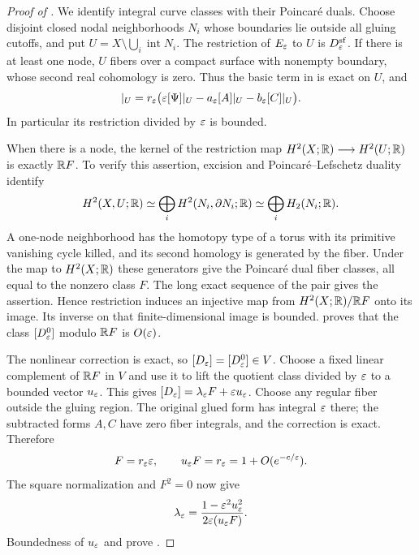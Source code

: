 \begin{proof}[Proof of ]
We identify integral curve classes with their Poincar\'e duals.
Choose disjoint closed nodal neighborhoods $N_i$ whose boundaries
lie outside all gluing cutoffs, and put
$U=X\setminus\bigcup_i\operatorname{int}N_i$.  The restriction of
$E_\varepsilon$ to $U$ is $D^{\mathrm{sf}}_\varepsilon$.  If there is at least
one node, $U$ fibers over a compact surface with nonempty boundary,
whose second real cohomology is zero.  Thus the basic term in
 is exact on $U$, and
\begin{equation}
  [D^0_\eps]|_U
  =r_\eps\bigl(\eps[\Psi]|_U
         -a_\eps[A]|_U-b_\eps[C]|_U\bigr).
  \label{eq:auxiliary-restriction-class}
\end{equation}
In particular its restriction divided by $\varepsilon$ is bounded.

When there is a node, the kernel of the restriction map
$H^2(X;\mathbb R)\longrightarrow H^2(U;\mathbb R)$ is exactly $\mathbb R F$.
To verify this assertion, excision and
Poincar\'e--Lefschetz duality identify
\[
  H^2(X,U;\mathbb R)
    \simeq\bigoplus_i H^2(N_i,\partial N_i;\mathbb R)
    \simeq\bigoplus_i H_2(N_i;\mathbb R).
\]
A one-node neighborhood has the homotopy type of a torus with its
primitive vanishing cycle killed, and its second homology is generated
by the fiber.  Under the map to $H^2(X;\mathbb R)$ these generators give
the Poincar\'e dual fiber classes, all equal to the nonzero class $F$.
The long exact sequence of the pair gives the assertion.
Hence restriction induces an injective map from
$H^2(X;\mathbb R)/\mathbb R F$ onto its image.  Its inverse on that
finite-dimensional image is bounded.   proves that the class
$[D^0_\varepsilon]$ modulo $\mathbb R F$ is $O(\varepsilon)$.

The nonlinear correction is exact, so
$[D_\varepsilon]=[D^0_\varepsilon]\in V$.  Choose a fixed linear complement of
$\mathbb R F$ in $V$ and use it to lift the quotient class divided by
$\varepsilon$ to a bounded vector $u_\varepsilon$.  This gives
$[D_\varepsilon]=\lambda_\varepsilon F+\varepsilon u_\varepsilon$.
Choose any regular fiber outside the gluing region.  The original
glued form has integral $\varepsilon$ there; the subtracted forms $A,C$
have zero fiber integrals, and the correction is exact.  Therefore
\begin{equation}
  [D_\eps]F=r_\eps\eps,\qquad u_\eps F=r_\eps=1+O(e^{-c/\eps}).
  \label{eq:auxiliary-fiber-area}
\end{equation}
The square normalization and $F^2=0$ now give
\begin{equation}
  \lambda_\varepsilon
    =\frac{1-\varepsilon^2u_\varepsilon^2}{2\varepsilon(u_\varepsilon F)}.
  \label{eq:auxiliary-lambda}
\end{equation}
Boundedness of $u_\varepsilon$ and
 prove
.


\end{proof}
